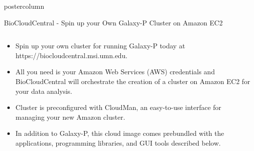 \documentclass[final]{beamer}
\begin{document}
\begin{frame}
\begin{columns}
\begin{column}{.49\textwidth}
\begin{beamercolorbox}[center,wd=\textwidth]{postercolumn}
\begin{minipage}[T]{.99\textwidth}
{\begin{block}{BioCloudCentral - Spin up your Own Galaxy-P Cluster on Amazon EC2}
\begin{columns}
                \begin{column}{.68\textwidth}
                  \begin{itemize}

                    \item Spin up your own cluster for running Galaxy-P
                    today at https://biocloudcentral.msi.umn.edu.

                    \item All you need is your Amazon Web Services (AWS)
                    credentials and BioCloudCentral will orchestrate the creation
                    of a cluster on Amazon EC2 for your data analysis.

                    \item Cluster is preconfigured with CloudMan, an easy-to-use
                    interface for managing your new Amazon cluster.

                    \item In addition to Galaxy-P, this cloud image comes prebundled 
                    with the applications, programming libraries, and GUI tools described below.

                  \end{itemize}
                \end{column}


\end{columns}
\end{block}}
\end{minipage}
\end{beamercolorbox}
\end{column}
\end{columns}
\end{frame}
\end{document}
